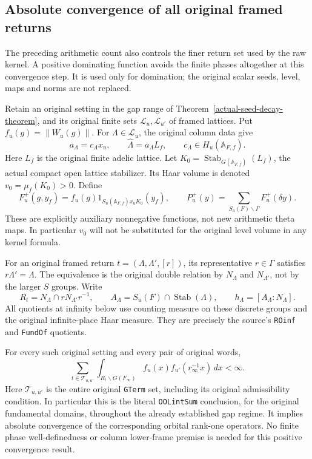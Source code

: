 \subsection{Absolute convergence of all original framed returns}
\label{global-gram-framed-returns}

The preceding arithmetic count also controls the finer return set
used by the raw kernel.  A positive dominating function avoids the
finite phases altogether at this convergence step.  It is used only
for domination; the original scalar seeds, level, maps and norms are
not replaced.

Retain an original setting in the gap range of
Theorem~\ref{actual-seed-decay-theorem}, and its original finite
sets $\mathcal L_u,\mathcal L_{u'}$ of framed lattices.  Put
$f_u(g)=\|W_u(g)\|$.  For $\Lambda\in\mathcal L_u$, the original
column data give
\[
 a_\Lambda=c_\Lambda x_u,\qquad
 \widehat\Lambda=a_\Lambda L_f,
 \qquad c_\Lambda\in H_u(\mathbb A_{F,f}).
\]
Here $L_f$ is the original finite adelic lattice.  Let
$K_0=\operatorname{Stab}_{G(\mathbb A_{F,f})}(L_f)$, the actual
compact open lattice stabilizer.  Its Haar volume is denoted
$v_0=\mu_f(K_0)>0$.  Define
\begin{equation}\label{global-gram-positive-seed}
 F_u^+(g,y_f)=f_u(g)1_{S_u(\mathbb A_{F,f})x_uK_0}(y_f),
 \qquad
 P_u^+(y)=\sum_{S_u(F)\backslash\Gamma}F_u^+(\delta y).
\end{equation}
These are explicitly auxiliary nonnegative functions, not new
arithmetic theta maps.  In particular $v_0$ will not be substituted
for the original level volume in any kernel formula.

For an original framed return $t=(\Lambda,\Lambda',[r])$, its
representative $r\in\Gamma$ satisfies $r\Lambda'=\Lambda$.
The equivalence is the original double relation by
$N_\Lambda$ and $N_{\Lambda'}$, not by the larger $S$ groups.
Write
\[
 R_t=N_\Lambda\cap rN_{\Lambda'}r^{-1},\qquad
 A_\Lambda=S_u(F)\cap\operatorname{Stab}(\Lambda),\qquad
 h_\Lambda=[A_\Lambda:N_\Lambda].
\]
All quotients at infinity below use counting measure on these
discrete groups and the original infinite-place Haar measure.
They are precisely the source's \texttt{ROinf} and
\texttt{FundOf} quotients.\cite{global-gram-framed-source}

\begin{theorem}
\label{global-gram-framed-sum}
For every such original setting and every pair of original words,
\begin{equation}\label{global-gram-original-oolint}
 \sum_{t\in\mathcal T_{u,u'}}
 \int_{R_t\backslash G(F_\infty)}
       f_u(x)f_{u'}(r_\infty^{-1}x)\,dx<\infty.
\end{equation}
Here $\mathcal T_{u,u'}$ is the entire original
\texttt{GTerm} set, including its original admissibility condition.
In particular this is the literal \texttt{OOLintSum} conclusion,
for the original fundamental domains, throughout the already
established gap regime.  It implies absolute convergence of the
corresponding orbital rank-one operators.  No finite phase
well-definedness or column lower-frame premise is needed for this
positive convergence result.
\end{theorem}

